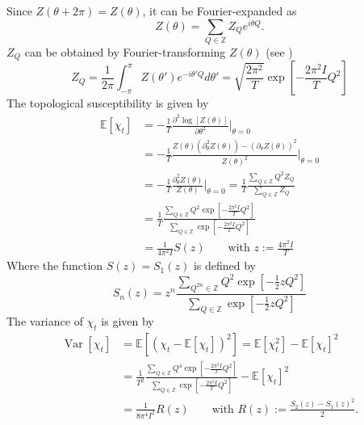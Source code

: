 \documentclass[11pt]{article}
\begin{document}
Since $Z(\theta+2\pi)=Z(\theta)$, it can be Fourier-expanded as
\begin{equation}
  Z(\theta)=\sum_{Q\in\mathbb{Z}} Z_Q e^{i\theta Q}.
\end{equation}
$Z_Q$ can be obtained by Fourier-transforming $Z(\theta)$ (see \cite{Bietenholz1997})
\begin{equation}
  Z_Q = \frac{1}{2\pi}\int_{-\pi}^{\pi} Z(\theta')e^{-i\theta'Q}d\theta'
  = \sqrt{\frac{2\pi^2}{T}}\exp\left[-\frac{2\pi^2I}{T}Q^2\right]
\end{equation}
The topological susceptibility is given by
\begin{equation}
  \begin{aligned}
    \mathbb{E}[\chi_t] &= -\frac{1}{T}\frac{\partial^2\log[Z(\theta)]}{\partial\theta^2}\Big\vert_{\theta=0}\\
    &= -\frac{1}{T}\frac{Z(\theta)(\partial^2_\theta Z(\theta))-(\partial_\theta Z(\theta))^2}{Z(\theta)^2}\Big\vert_{\theta=0}\\
    &= -\frac{1}{T}\frac{\partial^2_\theta Z(\theta)}{Z(\theta)}\Big\vert_{\theta=0}
    = \frac{1}{T}\frac{\sum_{Q\in\mathbb{Z}} Q^2 Z_Q}{\sum_{Q\in\mathbb{Z}}Z_Q}\\
    &= \frac{1}{T}\frac{\sum_{Q\in\mathbb{Z}} Q^2 \exp\left[-\frac{2\pi^2I}{T}Q^2\right]}{\sum_{Q\in\mathbb{Z}}\exp\left[-\frac{2\pi^2I}{T}Q^2\right]}\\
    &= \frac{1}{4\pi^2 I} S(z)\qquad\text{with $z:=\frac{4\pi^2 I}{T}$}
      \end{aligned}
\end{equation}
Where the function $S(z)=S_1(z)$ is defined by
\begin{equation}
  S_n(z) = z^n \frac{\sum_{Q^{2n}\in\mathbb{Z}}Q^2 \exp\left[-\frac{1}{2}zQ^2\right]}{\sum_{Q\in\mathbb{Z}}\exp\left[-\frac{1}{2}zQ^2\right]}\label{eqn:Sz}
\end{equation}
The variance of $\chi_t$ is given by
\begin{equation}
  \begin{aligned}
    \operatorname{Var}[\chi_t] &= \mathbb{E}\left[(\chi_t-\mathbb{E}[\chi_t])^2\right]=\mathbb{E}[\chi_t^2]-\mathbb{E}[\chi_t]^2\\
    &= \frac{1}{T^2}\frac{\sum_{Q\in\mathbb{Z}}Q^4\exp\left[-\frac{2\pi^2I}{T}Q^2\right]}{\sum_{Q\in\mathbb{Z}}\exp[-\frac{2\pi^2I}{T}Q^2]}-\mathbb{E}[\chi_t]^2\\
    &= \frac{1}{8\pi^4 I^2} R(z) \qquad\text{with $R(z):=\frac{S_2(z)-S_1(z)^2}{2}$.}
  \end{aligned}
\end{equation}
\end{document}
